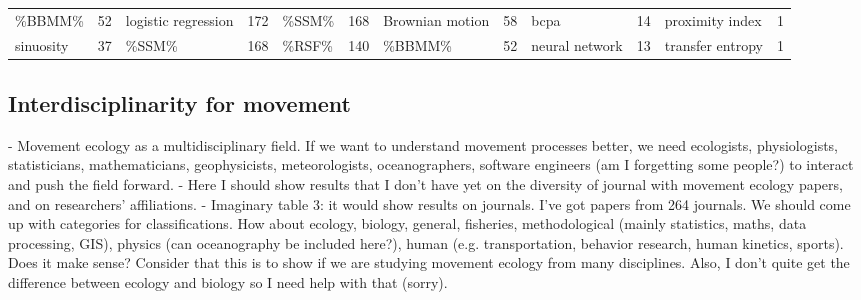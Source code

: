 \documentclass[9pt,twocolumn,twoside,lineno]{pnas-new}
\begin{document}
\begin{table}
\begin{tabular}{llllllllllll}
\%BBMM\%                 & 52    & logistic regression  & 172   & \%SSM\%             & 168   & Brownian motion        & 58    & bcpa                                     & 14    & proximity index                   & 1     \\
sinuosity                & 37    & \%SSM\%              & 168   & \%RSF\%             & 140   & \%BBMM\%               & 52    & neural network                           & 13    & transfer entropy                  & 1    \\
\bottomrule
\end{tabular}
\label{table:keywords-questions}
\end{table}

\subsection*{Interdisciplinarity for movement}

- Movement ecology as a multidisciplinary field. If we want to understand movement processes better, we need ecologists, physiologists, statisticians, mathematicians, geophysicists, meteorologists, oceanographers, software engineers (am I forgetting some people?) to interact and push the field forward. 
- Here I should show results that I don't have yet on the diversity of journal with movement ecology papers, and on researchers' affiliations. 
- Imaginary table 3: it would show results on journals. I've got papers from 264 journals. We should come up with categories for classifications. How about ecology, biology, general, fisheries, methodological (mainly statistics, maths, data processing, GIS), physics (can oceanography be included here?), human (e.g. transportation, behavior research, human kinetics, sports). Does it make sense? Consider that this is to show if we are studying movement ecology from many disciplines. Also, I don't quite get the difference between ecology and biology so I need help with that (sorry). 
\end{document}
